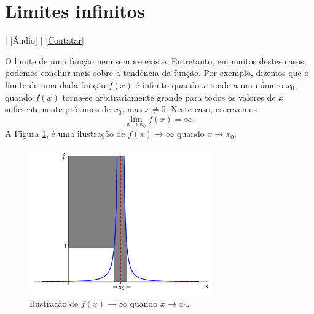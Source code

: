 \section{Limites infinitos}\label{cap_lim_sec_lim_inf}

\begin{flushright}
  [Vídeo] | [Áudio] | \href{https://phkonzen.github.io/notas/contato.html}{[Contatar]}
\end{flushright}

O limite de uma função nem sempre existe. Entretanto, em muitos destes casos, podemos concluir mais sobre a tendência da função. Por exemplo, dizemos que o limite de uma dada função $f(x)$ é infinito quando $x$ tende a um número $x_0$, quando $f(x)$ torna-se arbitrariamente grande para todos os valores de $x$ suficientemente próximos de $x_0$, mas $x\neq 0$. Neste caso, escrevemos
\begin{equation}
  \lim_{x\to x_0} f(x) = \infty.
\end{equation}
A Figura \ref{fig:liminf}, é uma ilustração de $f(x)\to\infty$ quando $x\to x_0$.

\begin{figure}[H]
  \centering
  \includegraphics[width=0.7\textwidth]{./cap_lim/dados/fig_liminf/fig_liminf}
  \caption{Ilustração de $f(x)\to\infty$ quando $x\to x_0$.}
  \label{fig:liminf}
\end{figure}


